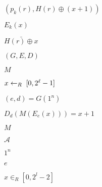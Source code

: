 \documentclass[10pt]{book}
\begin{document}
\begin{mdSnippets}
\begin{mdInlineSnippet}[0e9b360927d7711cd3205288624ad5db]%
$(p_k(r), H(r) \oplus (x + 1))$\end{mdInlineSnippet}%
\begin{mdInlineSnippet}%
$E_k(x)$\end{mdInlineSnippet}%
\begin{mdInlineSnippet}[d67324c21cc2be432d0ff0845f47bc90]%
$\bar{H(r) \oplus x}$\end{mdInlineSnippet}%
\begin{mdInlineSnippet}[b85e5fef323d7d3cb0465e35e6d6d405]%
$(G,E,D)$\end{mdInlineSnippet}%
\begin{mdInlineSnippet}[69691c7bdcc3ce6d5d8a1361f22d04ac]%
$M$\end{mdInlineSnippet}%
\begin{mdInlineSnippet}%
$x\leftarrow_R\; [0,2^{\ell}-1]$\end{mdInlineSnippet}%
\begin{mdInlineSnippet}%
$(e,d)=G(1^n)$\end{mdInlineSnippet}%
\begin{mdInlineSnippet}%
$D_d(M(E_e(x)))=x+1$\end{mdInlineSnippet}%
\begin{mdInlineSnippet}[69691c7bdcc3ce6d5d8a1361f22d04ac]%
$M$\end{mdInlineSnippet}%
\begin{mdInlineSnippet}[ad70146b431bea9ae74cf8385470c544]%
$\mathcal{A}$\end{mdInlineSnippet}%
\begin{mdInlineSnippet}%
$1^n$\end{mdInlineSnippet}%
\begin{mdInlineSnippet}[e1671797c52e15f763380b45e841ec32]%
$e$\end{mdInlineSnippet}%
\begin{mdInlineSnippet}[9c2f7ab40d4b0adcdb170c95e039de07]%
$x \in_R [0,2^l - 2]$\end{mdInlineSnippet}%

\end{mdSnippets}
\end{document}
